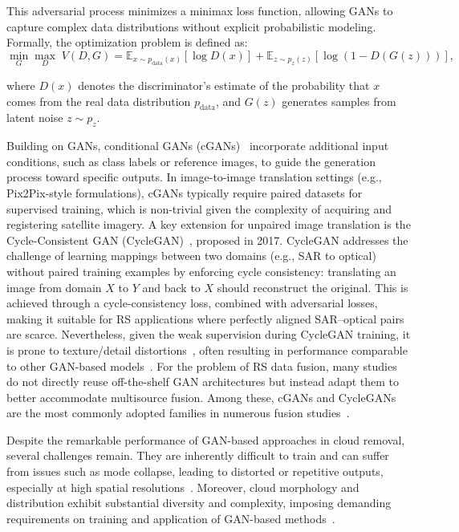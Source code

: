 This adversarial process minimizes a minimax loss function, allowing GANs to capture complex data distributions without explicit probabilistic modeling. Formally, the optimization problem is defined as:
\begin{equation}
\min_{G} \max_{D} \; V(D,G) = \mathbb{E}_{x \sim p_{\text{data}}(x)}[\log D(x)] 
+ \mathbb{E}_{z \sim p_{z}(z)}[\log (1 - D(G(z)))] ,
\end{equation}

where $D(x)$ denotes the discriminator’s estimate of the probability that $x$ comes from the real data distribution $p_{\text{data}}$, and $G(z)$ generates samples from latent noise $z \sim p_z$.

Building on GANs, conditional GANs (cGANs)~\cite{cGANs_mirza} incorporate additional input conditions, such as class labels or reference images, to guide the generation process toward specific outputs. In image-to-image translation settings (e.g., Pix2Pix-style formulations), cGANs typically require paired datasets for supervised training, which is non-trivial given the complexity of acquiring and registering satellite imagery. A key extension for unpaired image translation is the Cycle-Consistent GAN (CycleGAN)~\cite{cycle_GANs}, proposed in 2017. CycleGAN addresses the challenge of learning mappings between two domains (e.g., SAR to optical) without paired training examples by enforcing cycle consistency: translating an image from domain $X$ to $Y$ and back to $X$ should reconstruct the original. This is achieved through a cycle-consistency loss, combined with adversarial losses, making it suitable for RS applications where perfectly aligned SAR–optical pairs are scarce. Nevertheless, given the weak supervision during CycleGAN training, it is prone to texture/detail distortions~\cite{RS_Data_Fusion_GANs_sota}, often resulting in performance comparable to other GAN-based models~\cite{assessing_MT_cGANS_s2o_crop}.
For the problem of RS data fusion, many studies do not directly reuse off-the-shelf GAN architectures but instead adapt them to better accommodate multisource fusion. Among these, cGANs and CycleGANs are the most commonly adopted families in numerous fusion studies~\cite{RS_Data_Fusion_GANs_sota}.

Despite the remarkable performance of GAN-based approaches in cloud removal, several challenges remain. They are inherently difficult to train and can suffer from issues such as mode collapse, leading to distorted or repetitive outputs, especially at high spatial resolutions~\cite{GAN_gen_synt_MS}. Moreover, cloud morphology and distribution exhibit substantial diversity and complexity, imposing demanding requirements on training and application of GAN-based methods~\cite{DiffCR, CR_Advances_Review_ORS}.

